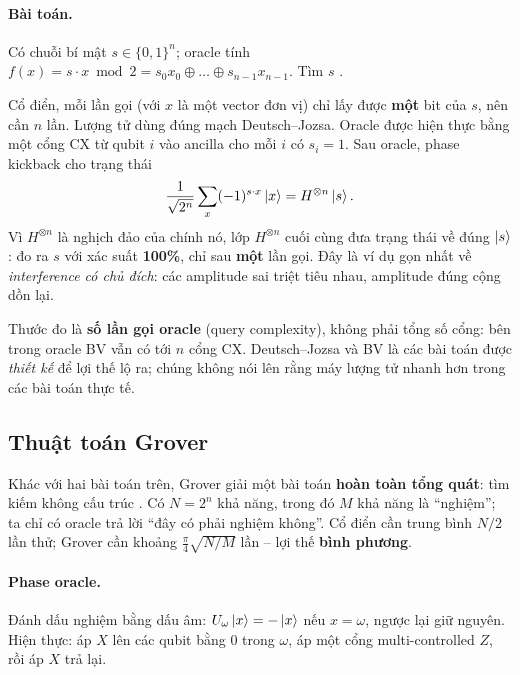 \paragraph{Bài toán.} Có chuỗi bí mật $s\in\{0,1\}^n$; oracle tính
$f(x) = s\cdot x \bmod 2 = s_0x_0\oplus\dots\oplus s_{n-1}x_{n-1}$. Tìm $s$ \cite{bernstein1997}.

Cổ điển, mỗi lần gọi (với $x$ là một vector đơn vị) chỉ lấy được \textbf{một} bit của $s$, nên cần
$n$ lần. Lượng tử dùng đúng mạch Deutsch--Jozsa. Oracle được hiện thực bằng một cổng CX từ qubit $i$
vào ancilla cho mỗi $i$ có $s_i=1$. Sau oracle, phase kickback cho trạng thái
\begin{equation}
  \frac{1}{\sqrt{2^n}}\sum_{x}(-1)^{s\cdot x}\ket{x} = H^{\otimes n}\ket{s}.
\end{equation}
Vì $H^{\otimes n}$ là nghịch đảo của chính nó, lớp $H^{\otimes n}$ cuối cùng đưa trạng thái về đúng
$\ket{s}$: đo ra $s$ với xác suất \textbf{100\%}, chỉ sau \textbf{một} lần gọi. Đây là ví dụ gọn nhất
về \emph{interference có chủ đích}: các amplitude sai triệt tiêu nhau, amplitude đúng cộng dồn lại.

\begin{keybox}
Thước đo là \textbf{số lần gọi oracle} (query complexity), không phải tổng số cổng: bên trong oracle
BV vẫn có tới $n$ cổng CX. Deutsch--Jozsa và BV là các bài toán được \emph{thiết kế} để lợi thế lộ ra;
chúng không nói lên rằng máy lượng tử nhanh hơn trong các bài toán thực tế.
\end{keybox}

\subsection{Thuật toán Grover}

Khác với hai bài toán trên, Grover giải một bài toán \textbf{hoàn toàn tổng quát}: tìm kiếm không cấu
trúc \cite{grover1996}. Có $N = 2^n$ khả năng, trong đó $M$ khả năng là ``nghiệm''; ta chỉ có oracle
trả lời ``đây có phải nghiệm không''. Cổ điển cần trung bình $N/2$ lần thử; Grover cần khoảng
$\frac{\pi}{4}\sqrt{N/M}$ lần -- lợi thế \textbf{bình phương}.

\paragraph{Phase oracle.} Đánh dấu nghiệm bằng dấu âm:
$U_\omega\ket{x} = -\ket{x}$ nếu $x=\omega$, ngược lại giữ nguyên. Hiện thực: áp $X$ lên các qubit
bằng 0 trong $\omega$, áp một cổng multi-controlled $Z$, rồi áp $X$ trả lại.


